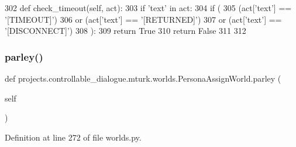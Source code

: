 \begin{DoxyCode}
302     \textcolor{keyword}{def }check\_timeout(self, act):
303         \textcolor{keywordflow}{if} \textcolor{stringliteral}{'text'} \textcolor{keywordflow}{in} act:
304             \textcolor{keywordflow}{if} (
305                 (act[\textcolor{stringliteral}{'text'}] == \textcolor{stringliteral}{'[TIMEOUT]'})
306                 \textcolor{keywordflow}{or} (act[\textcolor{stringliteral}{'text'}] == \textcolor{stringliteral}{'[RETURNED]'})
307                 \textcolor{keywordflow}{or} (act[\textcolor{stringliteral}{'text'}] == \textcolor{stringliteral}{'[DISCONNECT]'})
308             ):
309                 \textcolor{keywordflow}{return} \textcolor{keyword}{True}
310         \textcolor{keywordflow}{return} \textcolor{keyword}{False}
311 
312 
\end{DoxyCode}
\mbox{\label{classprojects_1_1controllable__dialogue_1_1mturk_1_1worlds_1_1PersonaAssignWorld_a6c8b0be29e30f5531e3c3f2dfea93966}} 
\subsubsection{\texorpdfstring{parley()}{parley()}}
{\footnotesize\ttfamily def projects.\+controllable\+\_\+dialogue.\+mturk.\+worlds.\+Persona\+Assign\+World.\+parley (\begin{DoxyParamCaption}\item[{}]{self }\end{DoxyParamCaption})}



Definition at line 272 of file worlds.\+py.



